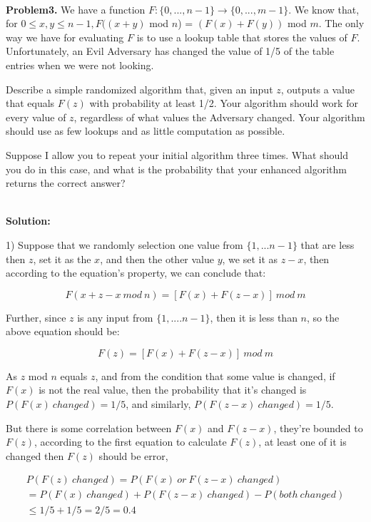 \documentclass{article}
\begin{document}
~\\

\noindent \textbf{Problem3.} We have a function $F: \{0,...,n-1\} \rightarrow \{0,...,m-1\}$. We know that, for $0 \le x, y \le n - 1, F((x +y)$ mod $n$) = $(F(x) + F(y))$ mod $m$. The only way we have for evaluating $F$ is to use a lookup table that
stores the values of $F$. Unfortunately, an Evil Adversary has changed the value of 1/5 of the table entries
when we were not looking.

Describe a simple randomized algorithm that, given an input $z$, outputs a value that equals $F(z)$ with
probability at least 1/2. Your algorithm should work for every value of $z$, regardless of what values the
Adversary changed. Your algorithm should use as few lookups and as little computation as possible.


Suppose I allow you to repeat your initial algorithm three times. What should you do in this case, and
what is the probability that your enhanced algorithm returns the correct answer?

~\\

\noindent \textbf{Solution:}

1) Suppose that we randomly selection one value from $\{1, ... n-1\}$ that are less then $z$, set it as the $x$, and then the other value $y$, we set it as $z-x$, then according to the equation's property, we can conclude that:

$$F(x + z-x \ mod \ n) = [F(x) + F(z-x)] \ mod \ m$$

Further, since $z$ is any input from $\{1, .... n-1 \}$, then it is less than $n$, so the above equation should be:

$$F(z) = [F(x) + F(z-x)] \ mod \ m$$

As $z$ mod $n$ equals $z$, and from the condition that some value is changed, if $F(x)$ is not the real value, then the probability that it's changed is $P(F(x) \ changed) = 1/5$, and similarly, $P(F(z-x) \ changed) = 1/5$.

But there is some correlation between $F(x)$ and $F(z-x)$, they're bounded to $F(z)$, according to the first equation to calculate $F(z)$, at least one of it is changed then $F(z)$ should be error,


\begin{equation}
\begin{aligned}
P(F(z) \ changed)
= P(F(x) \ or \ F(z-x) \ changed) \\
= P(F(x) \ changed)
+ P(F(z-x) \ changed)
- P(both \ changed) \\
\le 1/5 + 1/5 = 2/5 = 0.4
\end{aligned}
\end{equation}
\end{document}
